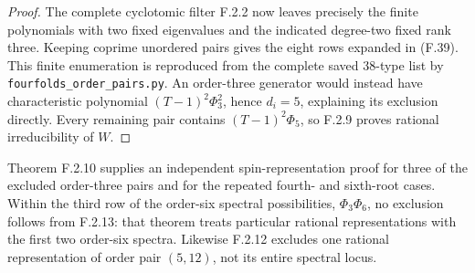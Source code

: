 \begin{proof}
The complete cyclotomic filter F.2.2 now leaves precisely
the finite polynomials with two fixed eigenvalues and
the indicated degree-two fixed rank three.
Keeping coprime unordered pairs gives the eight rows
expanded in (F.39).  This finite enumeration is reproduced
from the complete saved 38-type list by
\texttt{fourfolds\_order\_pairs.py}.
An order-three generator would instead have characteristic
polynomial $(T-1)^2\Phi_3^2$, hence $d_i=5$, explaining
its exclusion directly.
Every remaining pair contains $(T-1)^2\Phi_5$, so F.2.9
proves rational irreducibility of $W$.
\end{proof}

Theorem F.2.10 supplies an independent spin-representation
proof for three of the excluded order-three pairs and for
the repeated fourth- and sixth-root cases.
Within the third row of the order-six spectral possibilities,
$\Phi_3\Phi_6$, no exclusion follows from F.2.13: that theorem
treats particular rational representations with the first
two order-six spectra.  Likewise F.2.12 excludes one
rational representation of order pair $(5,12)$, not its
entire spectral locus.


